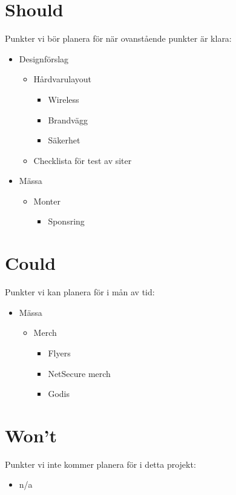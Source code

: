 \section*{Should}
Punkter vi bör planera för när ovanstående punkter är klara:

\begin{itemize}[noitemsep]
    \item Designförslag
    \begin{itemize}[noitemsep]
        \item Hårdvarulayout
        \begin{itemize}[noitemsep]
            \item Wireless
            \item Brandvägg
            \item Säkerhet
        \end{itemize}
        \item Checklista för test av siter
    \end{itemize}
    \item Mässa
    \begin{itemize}[noitemsep]
        \item Monter
        \begin{itemize}[noitemsep]
            \item Sponsring
        \end{itemize}
    \end{itemize}
\end{itemize}

\section*{Could}
Punkter vi kan planera för i mån av tid:

\begin{itemize}[noitemsep]
    \item Mässa
    \begin{itemize}[noitemsep]
        \item Merch
        \begin{itemize}[noitemsep]
            \item Flyers
            \item NetSecure merch
            \item Godis
        \end{itemize}
    \end{itemize}
\end{itemize}

\section*{Won't}
Punkter vi inte kommer planera för i detta projekt:
\begin{itemize}[noitemsep]
    \item n/a
\end{itemize}